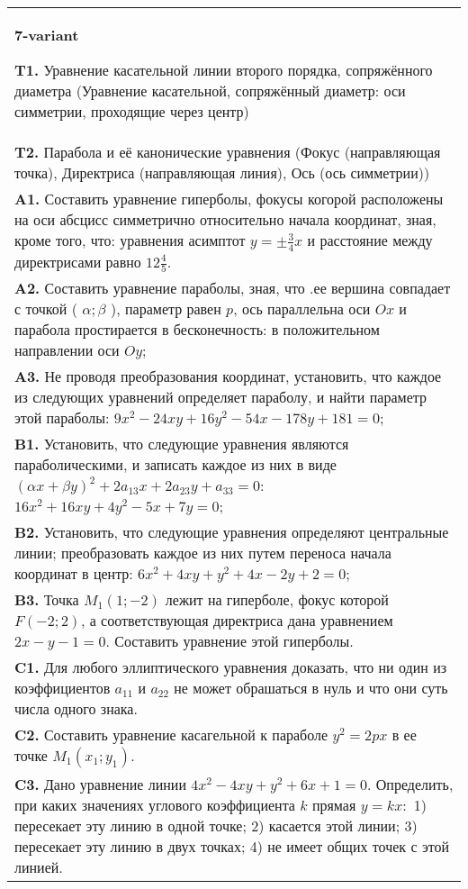 \documentclass{article}
\begin{document}
\begin{tabular}{m{17cm}}
\textbf{7-variant}
\newline

\textbf{T1.} Уравнение касательной линии второго порядка, сопряжённого диаметра (Уравнение касательной, сопряжённый диаметр: оси симметрии, проходящие через центр) \\
\textbf{T2.} Парабола и её канонические уравнения (Фокус (направляющая точка), Директриса (направляющая линия), Ось (ось симметрии)) \\
\textbf{A1.} Составить уравнение гиперболы, фокусы когорой расположены на оси абсцисс симметрично относительно начала координат, зная, кроме того, что: уравнения асимптот $y= \pm \frac{3}{4} x$ и расстояние между директрисами равно $12 \frac{4}{5}$. \\
\textbf{A2.} Составить уравнение параболы, зная, что .ее вершина совпадает с точкой ( $\alpha ; \beta$ ), параметр равен $p$, ось параллельна оси $O x$ и парабола простирается в бесконечность: в положительном направлении оси $O y$; \\
\textbf{A3.} Не проводя преобразования координат, установить, что каждое из следующих уравнений определяет параболу, и найти параметр этой параболы: $9 x^2-24 x y+16 y^2-54 x-178 y+181=0$; \\
\textbf{B1.} Установить, что следующие уравнения являются параболическими, и записать каждое из них в виде $(\alpha x+\beta y)^2+2 a_{13} x+2 a_{23} y+a_{33}=0$: $16 x^2+16 x y+4 y^2-5 x+7 y=0$; \\
\textbf{B2.} Установить, что следующие уравнения определяют центральные линии; преобразовать каждое из них путем переноса начала координат в центр: $6 x^2+4 x y+y^2+4 x-2 y+2=0$; \\
\textbf{B3.} Точка $M_1(1 ;-2)$ лежит на гиперболе, фокус которой $F(-2 ; 2)$, а соответствующая директриса дана уравнением $2 x-y-1=0$. Составить уравнение этой гиперболы. \\
\textbf{C1.} Для любого эллиптического уравнения доказать, что ни один из коэффициентов $a_{11}$ и $a_{22}$ не может обрашаться в нуль и что они суть числа одного знака. \\
\textbf{C2.} Составить уравнение касагельной к параболе $y^2=2 p x$ в ее точке $M_1\left(x_1 ; y_1\right)$. \\
\textbf{C3.} Дано уравнение линии $4 x^2-4 x y+y^2+6 x+1=0$. Определить, при каких значениях углового коэффициента $k$ прямая $y=k x:$ 1) пересекает эту линию в одной точке; 2) касается этой линии; 3) пересекает эту линию в двух точках; 4) не имеет общих точек с этой линией. \\

\end{tabular}
\vspace{1cm}
\end{document}
